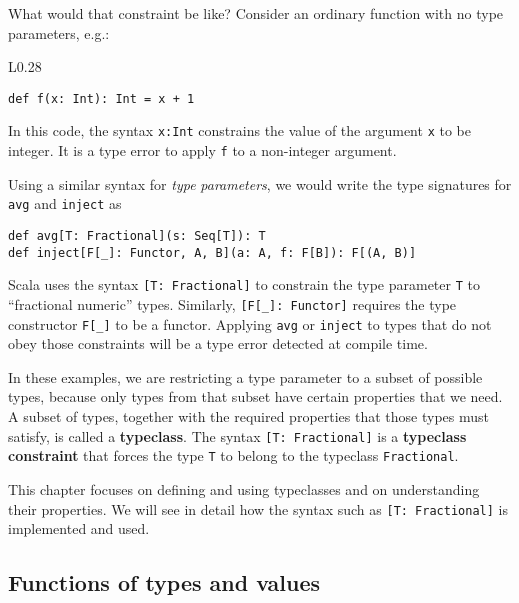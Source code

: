 What would that constraint be like? Consider an ordinary function
with no type parameters, e.g.:

\begin{wrapfigure}{L}{0.28\columnwidth}%
\vspace{-0.85\baselineskip}
\begin{lstlisting}
def f(x: Int): Int = x + 1
\end{lstlisting}

\vspace{-0.95\baselineskip}
\end{wrapfigure}%

\noindent In this code, the syntax \lstinline!x:Int! constrains the
value of the argument \lstinline!x! to be integer. It is a type error
to apply \lstinline!f! to a non-integer argument. 

Using a similar syntax for \emph{type} \emph{parameters}, we would
write the type signatures for \lstinline!avg! and \lstinline!inject!
as
\begin{lstlisting}
def avg[T: Fractional](s: Seq[T]): T
def inject[F[_]: Functor, A, B](a: A, f: F[B]): F[(A, B)]
\end{lstlisting}
Scala uses the syntax \lstinline![T: Fractional]! to constrain the
type parameter \lstinline!T! to ``fractional numeric'' types. Similarly,
\lstinline![F[_]: Functor]! requires the type constructor \lstinline!F[_]!
to be a functor. Applying \lstinline!avg! or \lstinline!inject!
to types that do not obey those constraints will be a type error detected
at compile time.

In these examples, we are restricting a type parameter to a subset
of possible types, because only types from that subset have certain
properties that we need. A subset of types, together with the required
properties that those types must satisfy, is called a \textbf{typeclass}.
The syntax \lstinline![T: Fractional]! is a \textbf{typeclass constraint}
that forces the type \lstinline!T! to belong to the typeclass \lstinline!Fractional!. 

This chapter focuses on defining and using typeclasses and on understanding
their properties. We will see in detail how the syntax such as \lstinline![T: Fractional]!
is implemented and used.

\subsection{Functions of types and values}

